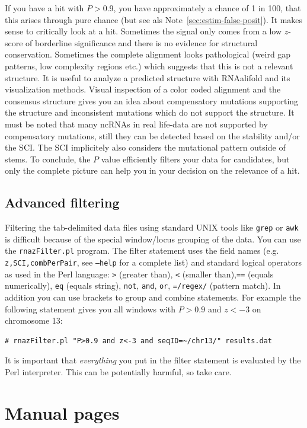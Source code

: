\documentclass[11pt]{article}
\begin{document}
If you have a hit with $P>$0.9, you have approximately a chance of 1 in
100, that this arises through pure chance (but see als
Note~\ref{sec:estim-false-posit}). It makes sense to critically look at a
hit. Sometimes the signal only comes from a low $z$-score of borderline
significance and there is no evidence for structural conservation.
Sometimes the complete alignment looks pathological (weird gap patterns,
low complexity regions etc.) which suggests that this is not a relevant
structure. It is useful to analyze a predicted structure with RNAalifold
and its visualization methods. Visual inspection of a color coded alignment
and the consensus structure gives you an idea about compensatory mutations
supporting the structure and inconsistent mutations which do not support
the structure. It must be noted that many ncRNAs in real life-data are not
supported by compensatory mutations, still they can be detected based on
the stability and/or the SCI. The SCI implicitely also considers the
mutational pattern outside of stems. To conclude, the $P$ value efficiently
filters your data for candidates, but only the complete picture can help
you in your decision on the relevance of a hit.

\subsection{Advanced filtering}
\label{sec:formulating-filter}

Filtering the tab-delimited data files using standard UNIX tools like
\texttt{grep} or \texttt{awk} is difficult because of the special
window/locus grouping of the data. You can use the \texttt{rnazFilter.pl}
program. The filter statement uses the field names (e.g.
\texttt{z,SCI,combPerPair}, see \texttt{--help} for a complete list) and
standard logical operators as used in the Perl language: \texttt{>}
(greater than), \texttt{<} (smaller than),\texttt{==} (equals numerically),
\texttt{eq} (equals string), \texttt{not}, \texttt{and}, \texttt{or},
\texttt{=\raisebox{-0.7ex}{\~{ }}/regex/} (pattern match).  In addition you
can use brackets to group and combine statements. For example the following
statement gives you all windows with $P>0.9$ and $z<-3$ on chromosome 13:

\begin{verbatim}
# rnazFilter.pl "P>0.9 and z<-3 and seqID=~/chr13/" results.dat
\end{verbatim}

It is important that \emph{everything} you put in the filter statement is
evaluated by the Perl interpreter. This can be potentially harmful, so take
care.

\clearpage


\sf \small

\normalfont
\normalsize

\appendix

\section{Manual pages}


\end{document}
